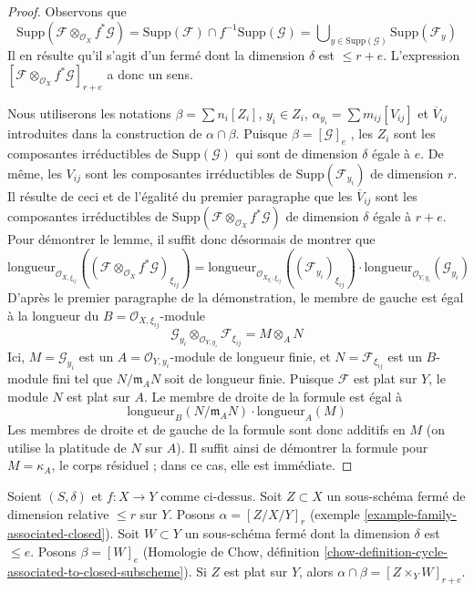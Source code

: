 \begin{proof} 
Observons que 
$$
\text{Supp}(\mathcal{F} \otimes_{\mathcal{O}_X} f^*\mathcal{G}) =
\text{Supp}(\mathcal{F}) \cap f^{-1}\text{Supp}(\mathcal{G}) =
\bigcup\nolimits_{y \in \text{Supp}(\mathcal{G})} \text{Supp}(\mathcal{F}_y)
$$
 Il en résulte qu'il s'agit d'un fermé dont la dimension $\delta$ est $\leq r + e$.
 L'expression 
$[\mathcal{F} \otimes_{\mathcal{O}_X} f^*\mathcal{G}]_{r + e}$
 a donc un sens. 

\medskip\noindent
 Nous utiliserons les notations 
$\beta = \sum n_i[Z_i]$, $y_i \in Z_i$, 
$\alpha_{y_i} = \sum m_{ij} [V_{ij}]$ et 
$\overline{V}_{ij}$ introduites dans la construction 
de $\alpha \cap \beta$. Puisque $\beta = [\mathcal{G}]_e$
 , les $Z_i$ sont les composantes irréductibles de 
$\text{Supp}(\mathcal{G})$ qui sont de dimension $\delta$ égale à $e$.
 De même, les $V_{ij}$ sont les composantes irréductibles 
de $\text{Supp}(\mathcal{F}_{y_i})$ de dimension $r$.
 Il résulte de ceci et de l'égalité du premier 
paragraphe que les $\overline{V}_{ij}$ sont les composantes 
irréductibles de 
$\text{Supp}(\mathcal{F} \otimes_{\mathcal{O}_X} f^*\mathcal{G})$
 de dimension $\delta$ égale à $r + e$.
 Pour démontrer le lemme, il suffit donc désormais de montrer que 
$$
\text{longueur}_{\mathcal{O}_{X, \xi_{ij}}}(
(\mathcal{F} \otimes_{\mathcal{O}_X} f^*\mathcal{G})_{\xi_{ij}})
=
\text{longueur}_{\mathcal{O}_{X_{y_i}, \xi_{ij}}}((\mathcal{F}_{y_i})_{\xi_{ij}})
\cdot
\text{longueur}_{\mathcal{O}_{Y, y_i}}(\mathcal{G}_{y_i})
$$
 D'après le premier paragraphe de la démonstration, le membre de gauche est 
égal à la longueur du $B = \mathcal{O}_{X, \xi_{ij}}$-module 
$$
\mathcal{G}_{y_i}
\otimes_{\mathcal{O}_{Y, y_i}}
\mathcal{F}_{\xi_{ij}} =
M \otimes_A N
$$
 Ici, $M = \mathcal{G}_{y_i}$ est un 
$A = \mathcal{O}_{Y, y_i}$-module de longueur finie, et $N = \mathcal{F}_{\xi_{ij}}$
 est un $B$-module fini tel que $N/\mathfrak m_AN$ soit de longueur finie. 
Puisque $\mathcal{F}$ est plat sur $Y$, le module $N$ est plat sur $A$. Le 
membre de droite de la formule est égal à 
$$
\text{longueur}_B(N/\mathfrak m_A N) \cdot \text{longueur}_A(M)
$$
 Les membres de droite et de gauche de la formule sont donc additifs en $M$
 (on utilise la platitude de $N$ sur $A$). Il suffit ainsi de démontrer la 
formule pour $M = \kappa_A$, le corps résiduel ; dans ce 
cas, elle est immédiate. 
\end{proof} 

\begin{lemma} 
\label{lemma-action-closed} 
Soient $(S, \delta)$ et $f : X \to Y$ comme ci-dessus. Soit $Z \subset X$
 un sous-schéma fermé de dimension relative $\leq r$ sur $Y$. 
Posons $\alpha = [Z/X/Y]_r$ (exemple \ref{example-family-associated-closed}). 
Soit $W \subset Y$ un sous-schéma fermé dont la dimension $\delta$ est $\leq e$. 
Posons $\beta = [W]_e$ (Homologie de Chow, définition 
\ref{chow-definition-cycle-associated-to-closed-subscheme}). 
Si $Z$ est plat sur $Y$, alors $\alpha \cap \beta = [Z \times_Y W]_{r + e}$. 
\end{lemma} 

